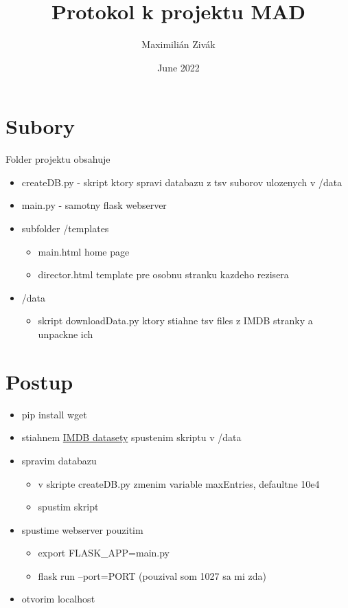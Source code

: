 \documentclass{article}
\title{Protokol k projektu MAD}
\author{Maximilián Zivák}
\date{June 2022}
\begin{document}
\maketitle

\section{Subory}
Folder projektu obsahuje
\begin{itemize}
    \item createDB.py - skript ktory spravi databazu z tsv suborov ulozenych v /data
    \item main.py - samotny flask webserver
    \item subfolder /templates
    \begin{itemize}
        \item main.html home page
        \item director.html template pre osobnu stranku kazdeho rezisera
    \end{itemize}
    \item /data
    \begin{itemize}
        \item skript downloadData.py ktory stiahne tsv files z IMDB stranky a unpackne ich
    \end{itemize}
\end{itemize}
\section{Postup}
\begin{itemize}
    \item pip install wget
    \item stiahnem  \href{http://datasets.imdbws.com/}{IMDB datasety} spustenim skriptu v /data
    \item spravim databazu
    \begin{itemize}
        \item v skripte createDB.py zmenim variable maxEntries, defaultne 10e4
        \item spustim skript
    \end{itemize}
    \item spustime webserver pouzitim
    \begin{itemize}
        \item export FLASK\_APP=main.py
        \item flask run --port=PORT (pouzival som 1027 sa mi zda)
    \end{itemize}
    \item otvorim localhost
\end{itemize}
\end{document}
